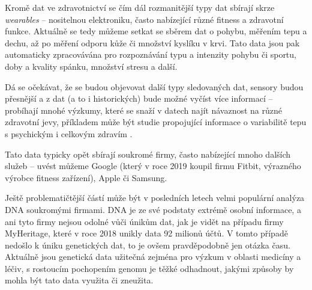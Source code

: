 Kromě dat ve zdravotnictví se čím dál rozmanitější typy dat sbírají skrze \textit{wearables} -- nositelnou elektroniku, často nabízející různé fitness a zdravotní funkce. Aktuálně se tedy můžeme setkat se sběrem dat o pohybu, měřením tepu a dechu, až po měření odporu kůže či množství kyslíku v krvi.
Tato data jsou pak automaticky zpracovávána pro rozpoznávání typu a intenzity pohybu či sportu, doby a kvality spánku, množství stresu a další.

Dá se očekávat, že se budou objevovat další typy sledovaných dat, sensory budou přesnější a z dat (a to i historických) bude možné vyčíst více informací -- probíhají mnohé výzkumy, které se snaží v datech najít návaznost na různé zdravotní jevy, příkladem může být studie propojující informace o variabilitě tepu s psychickým i celkovým zdravím \citep{heart-rate-health}.

Tato data typicky opět sbírají soukromé firmy, často nabízející mnoho dalších služeb -- uvést můžeme Google (který v roce 2019 koupil firmu Fitbit, výrazného výrobce fitness zařízení), Apple či Samsung.

Ještě problematičtější částí může být v posledních letech velmi populární analýza DNA soukromými firmami. DNA je ze své podstaty extrémě osobní informace, a ani tyto firmy nejsou odolné vůči únikům dat, jak je vidět na případu firmy MyHeritage, které v roce 2018 unikly data 92 milionů účtů. V tomto případě nedošlo k úniku genetických dat, to je ovšem pravděpodobně jen otázka času. Aktuálně jsou genetická data užitečná zejména pro výzkum v oblasti medicíny a léčiv, s rostoucím pochopením genomu je těžké odhadnout, jakými způsoby by mohla být tato data využita či zneužita.

